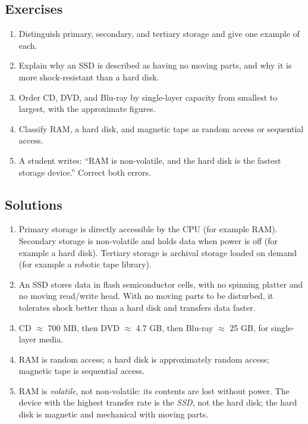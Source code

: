 \subsection*{Exercises}
\begin{enumerate}[label=\arabic*.]
  \item Distinguish primary, secondary, and tertiary storage and give one
    example of each.
  \item Explain why an SSD is described as having no moving parts, and why it
    is more shock-resistant than a hard disk.
  \item Order CD, DVD, and Blu-ray by single-layer capacity from smallest to
    largest, with the approximate figures.
  \item Classify RAM, a hard disk, and magnetic tape as random access or
    sequential access.
  \item A student writes: ``RAM is non-volatile, and the hard disk is the
    fastest storage device.'' Correct both errors.
\end{enumerate}

\subsection*{Solutions}
\begingroup\small
\begin{enumerate}[label=\arabic*.]
  \item Primary storage is directly accessible by the CPU (for example RAM).
    Secondary storage is non-volatile and holds data when power is off (for
    example a hard disk). Tertiary storage is archival storage loaded on
    demand (for example a robotic tape library).
  \item An SSD stores data in flash semiconductor cells, with no spinning
    platter and no moving read/write head. With no moving parts to be
    disturbed, it tolerates shock better than a hard disk and transfers data
    faster.
  \item CD $\approx$ 700 MB, then DVD $\approx$ 4.7 GB, then Blu-ray
    $\approx$ 25 GB, for single-layer media.
  \item RAM is random access; a hard disk is approximately random access;
    magnetic tape is sequential access.
  \item RAM is \emph{volatile}, not non-volatile: its contents are lost
    without power. The device with the highest transfer rate is the
    \emph{SSD}, not the hard disk; the hard disk is magnetic and mechanical
    with moving parts.
\end{enumerate}
\endgroup

